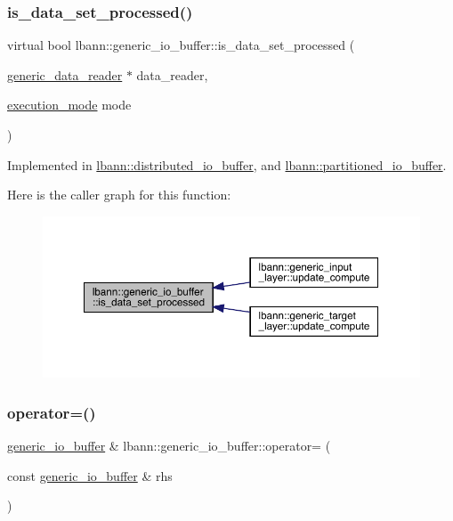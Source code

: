 \subsubsection{\texorpdfstring{is\+\_\+data\+\_\+set\+\_\+processed()}{is\_data\_set\_processed()}}
{\footnotesize\ttfamily virtual bool lbann\+::generic\+\_\+io\+\_\+buffer\+::is\+\_\+data\+\_\+set\+\_\+processed (\begin{DoxyParamCaption}\item[{\hyperlink{classlbann_1_1generic__data__reader}{generic\+\_\+data\+\_\+reader} $\ast$}]{data\+\_\+reader,  }\item[{\hyperlink{base_8hpp_a2781a159088df64ed7d47cc91c4dc0a8}{execution\+\_\+mode}}]{mode }\end{DoxyParamCaption})\hspace{0.3cm}{\ttfamily [pure virtual]}}



Implemented in \hyperlink{classlbann_1_1distributed__io__buffer_a2e214f6542d9b12c8a29bf41d0ee220e}{lbann\+::distributed\+\_\+io\+\_\+buffer}, and \hyperlink{classlbann_1_1partitioned__io__buffer_a0944161f90eb65286974c3e85155608f}{lbann\+::partitioned\+\_\+io\+\_\+buffer}.

Here is the caller graph for this function\+:\nopagebreak
\begin{figure}[H]
\begin{center}
\leavevmode
\includegraphics[width=350pt]{classlbann_1_1generic__io__buffer_a9a038d40aec50dbc24c0abe21ad0c0a9_icgraph}
\end{center}
\end{figure}
\mbox{\label{classlbann_1_1generic__io__buffer_ae8d2b80e11cf780def151a425a6b1fa0}} 
\subsubsection{\texorpdfstring{operator=()}{operator=()}}
{\footnotesize\ttfamily \hyperlink{classlbann_1_1generic__io__buffer}{generic\+\_\+io\+\_\+buffer} \& lbann\+::generic\+\_\+io\+\_\+buffer\+::operator= (\begin{DoxyParamCaption}\item[{const \hyperlink{classlbann_1_1generic__io__buffer}{generic\+\_\+io\+\_\+buffer} \&}]{rhs }\end{DoxyParamCaption})}



